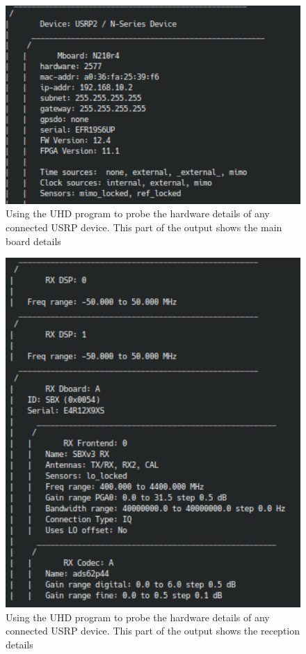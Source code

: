 \begin{figure}[h]
    \begin{centering}
        \includegraphics[width=12cm,keepaspectratio]{Figures/usrp-probe-output_1.png}
        \caption{Using the UHD program to probe the hardware details of any connected USRP device. This part of the output shows the main board details}
    \label{fig:UHDProbe1}
    \end{centering}
\end{figure}

\begin{figure}[h]
    \begin{centering}
        \includegraphics[width=12cm,keepaspectratio]{Figures/usrp-probe-output_2.png}
        \caption{Using the UHD program to probe the hardware details of any connected USRP device. This part of the output shows the reception details}
    \label{fig:UHDProbe2}
    \end{centering}
\end{figure}

